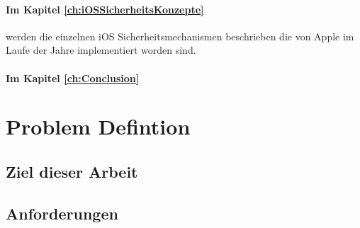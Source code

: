 \paragraph{Im Kapitel \ref{ch:iOSSicherheitsKonzepte}} werden die einzelnen iOS Sicherheitsmechanismen beschrieben die von Apple im Laufe der Jahre implementiert worden sind.

\paragraph{Im Kapitel \ref{ch:Conclusion}}



\section{Problem Defintion}
\label{sec:IntroProblem}

\subsection{Ziel dieser Arbeit}
\label{sec:IntroZiel}

\subsection{Anforderungen}
\label{sec:IntroAnforderungen}






